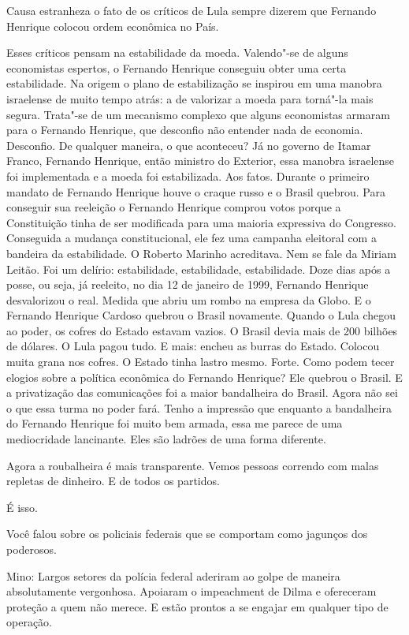 \falaG Causa estranheza o fato de os críticos de Lula sempre dizerem que
Fernando Henrique colocou ordem econômica no País.

\falaM Esses críticos pensam na estabilidade da moeda. Valendo"-se de alguns
economistas espertos, o Fernando Henrique conseguiu obter uma certa
estabilidade. Na origem o plano de estabilização se inspirou em uma
manobra israelense de muito tempo atrás: a de valorizar a moeda para
torná"-la mais segura. Trata"-se de um mecanismo complexo que alguns
economistas armaram para o Fernando Henrique, que desconfio não entender
nada de economia. Desconfio. De qualquer maneira, o que aconteceu? Já no
governo de Itamar Franco, Fernando Henrique, então ministro do Exterior,
essa manobra israelense foi implementada e a moeda foi estabilizada. Aos
fatos. Durante o primeiro mandato de Fernando Henrique houve o craque
russo e o Brasil quebrou. Para conseguir sua reeleição o Fernando
Henrique comprou votos porque a Constituição tinha de ser modificada
para uma maioria expressiva do Congresso. Conseguida a mudança
constitucional, ele fez uma campanha eleitoral com a bandeira da
estabilidade. O Roberto Marinho acreditava. Nem se fale da Miriam
Leitão. Foi um delírio: estabilidade, estabilidade, estabilidade. Doze
dias após a posse, ou seja, já reeleito, no dia 12 de janeiro de 1999,
Fernando Henrique desvalorizou o real. Medida que abriu um rombo na
empresa da Globo. E o Fernando Henrique Cardoso quebrou o Brasil
novamente. Quando o Lula chegou ao poder, os cofres do Estado estavam
vazios. O Brasil devia mais de 200 bilhões de dólares. O Lula pagou
tudo. E mais: encheu as burras do Estado. Colocou muita grana nos
cofres. O Estado tinha lastro mesmo. Forte. Como podem tecer elogios
sobre a política econômica do Fernando Henrique? Ele quebrou o Brasil. E
a privatização das comunicações foi a maior bandalheira do Brasil. Agora
não sei o que essa turma no poder fará. Tenho a impressão que enquanto a
bandalheira do Fernando Henrique foi muito bem armada, essa me parece de
uma mediocridade lancinante. Eles são ladrões de uma forma diferente.

\falaG Agora a roubalheira é mais transparente. Vemos pessoas correndo com
malas repletas de dinheiro. E de todos os partidos.

\falaM É isso.

\falaG Você falou sobre os policiais federais que se comportam como jagunços
dos poderosos.

Mino: Largos setores da polícia federal aderiram ao golpe de maneira
absolutamente vergonhosa. Apoiaram o impeachment de Dilma e ofereceram
proteção a quem não merece. E estão prontos a se engajar em qualquer
tipo de operação.

